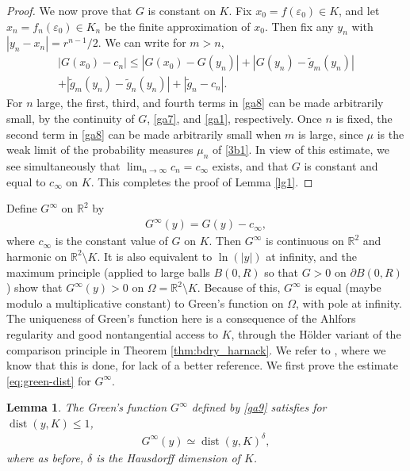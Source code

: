 \documentclass[JEP,XML,SOM,Unicode,published]{cedram}
\let\sm\setminus
\numberwithin{equation}{section}
\theoremstyle{plain}
\newtheorem{lem}{Lemma}[section]
\theoremstyle{definition}
\newcommand{\R}{\mathbb{R}}
\let\sm\setminus
\DeclareMathOperator{\dist}{dist}
\newcommand{\R}{\mathbb{R}}
\renewcommand{\d}{\partial}
\DeclareMathOperator{\dist}{dist}
\begin{document}
\begin{proof}
We now prove that $G$ is constant on $K$.
Fix $x_0 \!=\! f (\varepsilon_0) \!\in\! K$, and let \hbox{$x_n \!=\! f_n(\varepsilon_0) \!\in\! K_n$} be the finite
approximation of $x_0$.
Then fix any $y_n$ with $|y_n - x_n| = r^{n-1}/2$. We can write for $m > n$,
\begin{multline}\label{ga8}
	\left| G(x_0) - c_n \right| \le |G(x_0) - G(y_n)| + |G(y_n) - \tilde{g}_m(y_n)| \\
	 + | \tilde{g}_m(y_n) - \tilde{g}_n(y_n) | + | \tilde{g}_n - c_n|.
\end{multline}
For $n$ large, the first, third, and fourth terms in \eqref{ga8} can be made arbitrarily small, by the continuity of $G$, \eqref{ga7}, and \eqref{ga1}, respectively. Once $n$ is fixed, the second term in \eqref{ga8} can be made arbitrarily small when $m$
is large, since $\mu$ is the weak limit of the probability measures $\mu_n$ of \eqref{3b1}.
	In view of this estimate, we see simultaneously that $\lim_{n \to \infty} c_n = c_\infty$ exists, and that $G$ is constant and equal to $c_\infty$ on $K$. This completes the proof of Lemma \ref{lg1}.
	\end{proof}

Define $G^\infty$ on $\R^2$ by
\begin{align} \label{ga9}
G^\infty(y) = G(y) - c_\infty,
\end{align}
where $c_\infty$ is the constant value of $G$ on $K$.
Then $G^\infty$ is continuous on $\R^2$ and harmonic on $\R^2 \sm K$. It is also equivalent
to $\ln(|y|)$ at infinity, and the maximum principle (applied to large balls $B(0,R)$ so that $G > 0$ on
$\d B(0,R)$) show that $G^\infty(y) > 0$ on $\Omega = \R^2 \sm K$. Because of this, $G^\infty$ is equal
(maybe modulo a multiplicative constant) to Green's function on $\Omega$, with pole at infinity.
The uniqueness of Green's function here is a consequence of the Ahlfors regularity and good nontangential
access to $K$, through the Hölder variant of the comparison principle in Theorem \ref{thm:bdry_harnack}.
We refer to \cite{DEM21}, where we know that this is done, for lack of a better reference.
We first prove the estimate \eqref{eq:green-dist} for $G^\infty$.

\begin{lem}\label{lem:greeninfinity}
The Green's function $G^\infty$ defined by \eqref{ga9} satisfies for $\dist(y, K) \le 1$,
\begin{align} \label{ga10}
G^\infty(y) \simeq \dist(y, K)^\delta,
\end{align}
where as before, $\delta$ is the Hausdorff dimension of $K$.
\end{lem}
\end{document}
